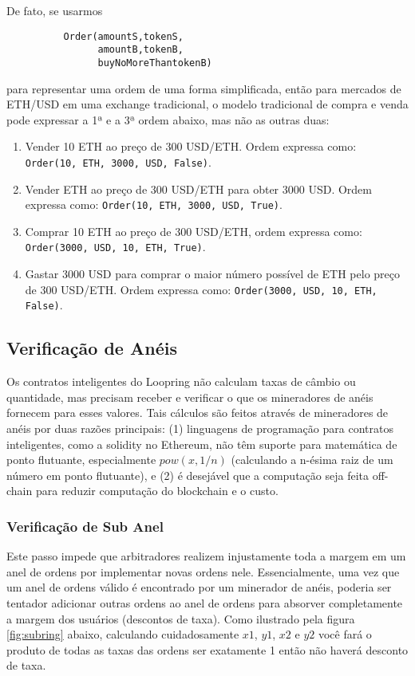 \documentclass[UTF8,nofonts]{article}
\begin{document}
\begin{multicols}{2}
De fato, se usarmos
\begin{verbatim}
	      Order(amountS,tokenS,
	            amountB,tokenB,
	            buyNoMoreThantokenB)
\end{verbatim}
para representar uma ordem de uma forma simplificada, então para mercados de ETH/USD em uma exchange tradicional, o modelo tradicional de compra e venda pode expressar a 1ª e a 3ª ordem abaixo, mas não as outras duas:

\begin{enumerate}
	\item Vender 10 ETH ao preço de 300 USD/ETH. Ordem expressa como: \verb|Order(10, ETH, 3000, USD, False)|.
	\item Vender ETH ao preço de 300 USD/ETH para obter 3000 USD. Ordem expressa como: \verb|Order(10, ETH, 3000, USD, True)|.
	\item Comprar 10 ETH ao preço de 300 USD/ETH, ordem expressa como: \verb|Order(3000, USD, 10, ETH, True)|.
	\item Gastar 3000 USD para comprar o maior número possível de ETH pelo preço de 300 USD/ETH. Ordem expressa como: \verb|Order(3000, USD, 10, ETH, False)|.
\end{enumerate}

\subsection{Verificação de Anéis\label{sec:ring_verification}}
Os contratos inteligentes do Loopring não calculam taxas de câmbio ou quantidade, mas precisam receber e verificar o que os mineradores de anéis fornecem para esses valores. Tais cálculos são feitos através de mineradores de anéis por duas razões principais: (1) linguagens de programação para contratos inteligentes, como a solidity\cite{dannen2017introducing} no Ethereum, não têm suporte para matemática de ponto flutuante, especialmente $pow(x, 1/n)$ (calculando a n-ésima raiz de um número em ponto flutuante), e (2) é desejável que a computação seja feita off-chain para reduzir computação do blockchain e o custo.

\subsubsection{Verificação de Sub Anel\label{sec:sub_ring_check}}
Este passo impede que arbitradores realizem injustamente toda a margem em um anel de ordens por implementar novas ordens nele. Essencialmente, uma vez que um anel de ordens válido é encontrado por um minerador de anéis, poderia ser tentador adicionar outras ordens ao anel de ordens para absorver completamente a margem dos usuários (descontos de taxa). Como ilustrado pela figura \ref{fig:subring} abaixo, calculando cuidadosamente $x1$, $y1$, $x2$ e $y2$ você fará o produto de todas as taxas das ordens ser exatamente 1 então não haverá desconto de taxa.


\end{multicols}
\end{document}
